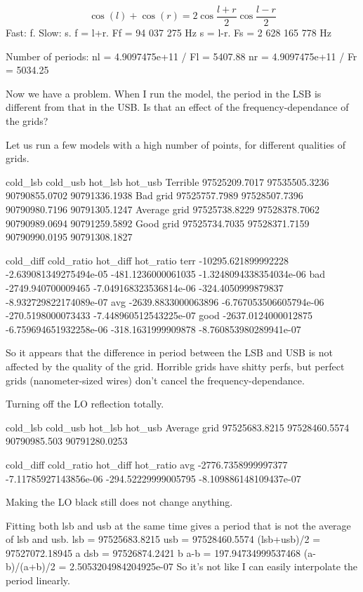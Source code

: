 \begin{equation}
    \cos(l) + \cos(r) = 2 \cos \frac{l+r}{2} \cos \frac{l-r}{2}
\end{equation}
Fast: f.  Slow: s.
f = l+r.  Ff =    94 037 275 Hz
s = l-r.  Fs = 2 628 165 778 Hz

Number of periods:
nl = 4.9097475e+11 / Fl = 5407.88
nr = 4.9097475e+11 / Fr = 5034.25

Now we have a problem.  When I run the model, the period in the LSB is different from that in the USB.  Is that an effect of the frequency-dependance of the grids?

Let us run a few models with a high number of points, for different qualities of grids.

             cold_lsb      cold_usb      hot_lsb       hot_usb
Terrible     97525209.7017 97535505.3236 90790855.0702 90791336.1938
Bad grid     97525757.7989 97528507.7396 90790980.7196 90791305.1247
Average grid 97525738.8229 97528378.7062 90790989.0694 90791259.5892
Good grid    97525734.7035 97528371.7159 90790990.0195 90791308.1827

     cold_diff           cold_ratio             hot_diff           hot_ratio
terr -10295.621899992228 -2.639081349275494e-05 -481.1236000061035 -1.3248094338354034e-06
bad  -2749.940700009465  -7.049168323536814e-06 -324.4050999879837 -8.932729822174089e-07
avg  -2639.8833000063896 -6.767053506605794e-06 -270.5198000073433 -7.448960512543225e-07
good -2637.0124000012875 -6.759694651932258e-06 -318.1631999909878 -8.760853980289941e-07

So it appears that the difference in period between the LSB and USB is not affected by the quality of the grid.  Horrible grids have shitty perfs, but perfect grids (nanometer-sized wires) don't cancel the frequency-dependance.

Turning off the LO reflection totally.

             cold_lsb      cold_usb      hot_lsb       hot_usb
Average grid 97525683.8215 97528460.5574 90790985.503 90791280.0253

     cold_diff           cold_ratio             hot_diff           hot_ratio
avg  -2776.7358999997377 -7.11785927143856e-06 -294.52229999005795 -8.109886148109437e-07

Making the LO black still does not change anything.

Fitting both lsb and usb at the same time gives a period that is not the average of lsb and usb.
lsb = 97525683.8215
usb = 97528460.5574
(lsb+usb)/2   = 97527072.18945 a
dsb           = 97526874.2421  b
a-b           = 197.94734999537468
(a-b)/(a+b)/2 = 2.5053204984204925e-07
So it's not like I can easily interpolate the period linearly.

